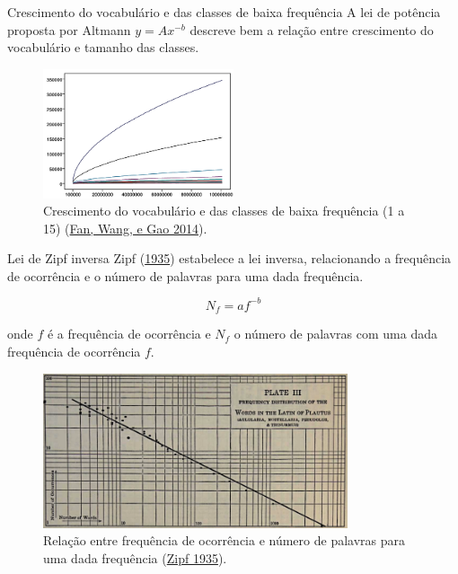 \documentclass[
  ignorenonframetext,
  aspectratio=169]{beamer}
\begin{document}
\begin{frame}{Crescimento do vocabulário e das classes de baixa
frequência}
\protect\hypertarget{crescimento-do-vocabuluxe1rio-e-das-classes-de-baixa-frequuxeancia}{}
A lei de potência proposta por Altmann \(y = Ax^{-b}\) descreve bem a
relação entre crescimento do vocabulário e tamanho das classes.

\begin{figure}
\centering
\includegraphics[width=0.5\textwidth,height=\textheight]{classsizegrowth.png}
\caption{Crescimento do vocabulário e das classes de baixa frequência (1
a 15) (\protect\hyperlink{ref-fan2014some}{Fan, Wang, e Gao 2014}).}
\end{figure}
\end{frame}

\begin{frame}{Lei de Zipf inversa}
\protect\hypertarget{lei-de-zipf-inversa}{}
Zipf (\protect\hyperlink{ref-zipf1935}{1935}) estabelece a lei inversa,
relacionando a frequência de ocorrência e o número de palavras para uma
dada frequência.

\[
N_f = a f^{-b}
\]

onde \(f\) é a frequência de ocorrência e \(N_f\) o número de palavras
com uma dada frequência de ocorrência \(f\).
\end{frame}

\begin{frame}
\begin{figure}
\centering
\includegraphics[width=0.8\textwidth,height=\textheight]{zipf-inverse.png}
\caption{Relação entre frequência de ocorrência e número de palavras
para uma dada frequência (\protect\hyperlink{ref-zipf1935}{Zipf 1935}).}
\end{figure}
\end{frame}
\end{document}
